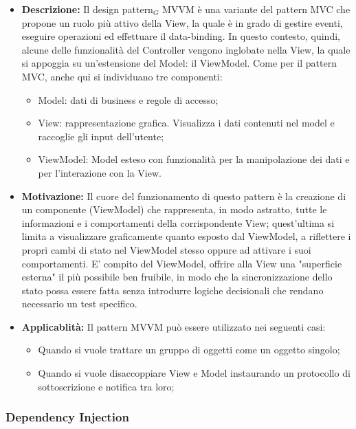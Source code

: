 \begin{itemize}
\item \textbf{Descrizione:} Il design pattern$_G$ MVVM è una variante del pattern MVC che propone un ruolo più attivo della View, la quale è in grado di gestire eventi, eseguire operazioni ed effettuare il data-binding. In questo contesto, quindi, alcune delle funzionalità del Controller vengono inglobate nella View, la quale si appoggia su un’estensione del Model: il ViewModel. Come per il pattern MVC, anche qui si individuano tre componenti:

\begin{itemize}
\item Model: dati di business e regole di accesso;
\item View: rappresentazione grafica. Visualizza i dati contenuti nel model e raccoglie gli input dell’utente;
\item ViewModel: Model esteso con funzionalità per la manipolazione dei dati e per l’interazione con la View.
\end{itemize}

\item \textbf{Motivazione:}  Il cuore del funzionamento di questo pattern è la creazione di un componente (ViewModel) che rappresenta, in modo astratto, tutte le informazioni e i comportamenti della corrispondente View; quest'ultima si limita a visualizzare graficamente quanto esposto dal ViewModel, a riflettere i propri cambi di stato nel ViewModel stesso oppure ad attivare i suoi comportamenti. 
E' compito del ViewModel, offrire alla View una "superficie esterna" il più possibile ben fruibile, in modo che la sincronizzazione dello stato possa essere fatta senza introdurre logiche decisionali che rendano necessario un test specifico.

\item \textbf{Applicablità:} Il pattern MVVM può essere utilizzato nei seguenti casi:

\begin{itemize}
\item Quando si vuole trattare un gruppo di oggetti come un oggetto singolo;
\item Quando si vuole disaccoppiare View e Model instaurando un protocollo di sottoscrizione e notifica tra loro;
\end{itemize}

\end{itemize}

\subsubsection{Dependency Injection}

